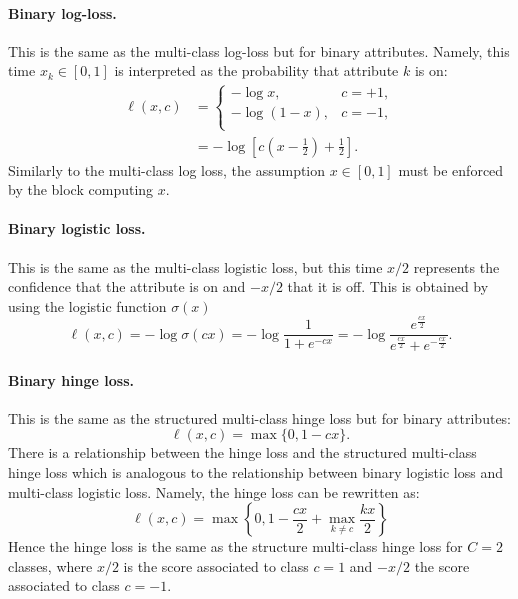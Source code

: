 \paragraph{Binary log-loss.} This is the same as the multi-class log-loss but for binary attributes. Namely, this time $x_k \in [0,1]$ is interpreted as the probability that attribute $k$ is on:
\begin{align}\label{e:loss-binarylogloss}
\ell(x,c)
&=
\begin{cases}
- \log x, & c = +1, \\
- \log (1 - x), & c = -1, \\
\end{cases}
\\
&=
- \log \left[ c \left(x - \frac{1}{2}\right) + \frac{1}{2} \right].
\end{align}
Similarly to the multi-class log loss, the assumption $x \in [0,1]$ must be enforced by the block computing $x$.

\paragraph{Binary logistic loss.} This is the same as the multi-class logistic loss, but this time $x/2$ represents the confidence that the attribute is on and $-x/2$ that it is off. This is obtained by using the logistic function $\sigma(x)$
\begin{equation}\label{e:loss-binarylogistic}
 \ell(x,c)
 =
 - \log \sigma(cx)
 =
 -\log \frac{1}{1 + e^{-{cx}}}
 =
 -\log \frac{e^{\frac{cx}{2}}}{e^{\frac{cx}{2}} + e^{-\frac{cx}{2}}}.
\end{equation}

\paragraph{Binary hinge loss.} This is the same as the structured multi-class hinge loss but for binary attributes:
\begin{equation}\label{e:loss-hinge}
\ell(x,c)
=
\max\{0, 1 - cx\}.
\end{equation}
There is a relationship between the hinge loss and the structured multi-class hinge loss which is analogous to the relationship between binary logistic loss and multi-class logistic loss. Namely, the hinge loss can be rewritten as:
\[
\ell(x,c) = \max\left\{0, 1 - \frac{cx}{2} + \max_{k\not= c} \frac{kx}{2}\right\}
\]
Hence the hinge loss is the same as the structure multi-class hinge loss for $C=2$ classes, where $x/2$ is the score associated to class $c=1$ and $-x/2$ the score associated to class $c=-1$.

